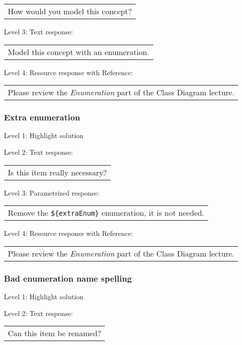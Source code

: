 \begin{tabular}{|c}
How would you model this concept?
\end{tabular} \medskip

\noindent Level 3: Text response: \medskip

\begin{tabular}{|c}
Model this concept with an enumeration.
\end{tabular} \medskip

\noindent Level 4: Resource response with Reference:

\begin{tabular}{|c}
Please review the \textit{Enumeration} part of the Class Diagram lecture.
\end{tabular} \medskip


\subsubsection{Extra enumeration}

\noindent Level 1: Highlight solution \medskip

\noindent Level 2: Text response: \medskip

\begin{tabular}{|c}
Is this item really necessary?
\end{tabular} \medskip

\noindent Level 3: Parametrized response: \medskip

\begin{tabular}{|c}
Remove the \verb|${extraEnum}| enumeration, it is not needed.
\end{tabular} \medskip

\noindent Level 4: Resource response with Reference:

\begin{tabular}{|c}
Please review the \textit{Enumeration} part of the Class Diagram lecture.
\end{tabular} \medskip


\subsubsection{Bad enumeration name spelling}

\noindent Level 1: Highlight solution \medskip

\noindent Level 2: Text response: \medskip

\begin{tabular}{|c}
Can this item be renamed?
\end{tabular} \medskip

